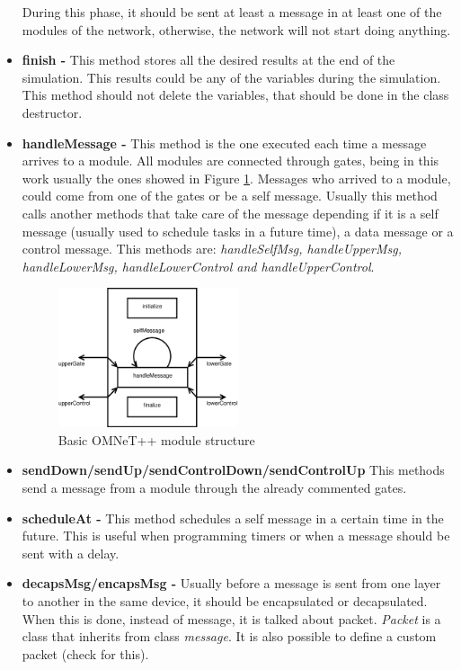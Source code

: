 \begin{itemize}
During this phase, it should be sent at least a message in at least one of the modules of the network, otherwise, the network will not start doing 
anything.
 \item \textbf{finish - }This method stores all the desired results at the end of the simulation. This results could be any of the variables during the 
simulation. This method should not delete the variables, that should be done in the class destructor.
 \item \textbf{handleMessage - }This method is the one executed each time a message arrives to a module. All modules are connected through gates,
being in this work usually the ones showed in Figure \ref{fig:omnetmodule}. Messages who arrived to a module, could come from one of the gates or be a self
message. Usually this method calls another methods that take care of the message depending if it is a self message (usually used to schedule 
tasks in a future time), a data message or a control message. This methods are: \textit{handleSelfMsg, handleUpperMsg, handleLowerMsg, 
handleLowerControl and handleUpperControl}.
\begin{figure}[ht]
 \begin{center}
  \includegraphics[width=0.5\textwidth]{omnetmodule.eps}
 \end{center}
 \caption{Basic \ac{OMNeT++} module structure}
 \label{fig:omnetmodule}
\end{figure}
 \item \textbf{sendDown/sendUp/sendControlDown/sendControlUp }This methods send a message from a module through the already commented gates.
 \item \textbf{scheduleAt - }This method schedules a self message in a certain time in the future. This is useful when programming timers or when a
message should be sent with a delay.
 \item \textbf{decapsMsg/encapsMsg - }Usually before a message is sent from one layer to another in the same device, it should be encapsulated or 
decapsulated. When this is done, instead of message, it is talked about packet. \textit{Packet} is a class that inherits from class \textit{message}. It 
is also possible to define a custom packet (check \cite{manualomnet} for this).
\end{itemize}

